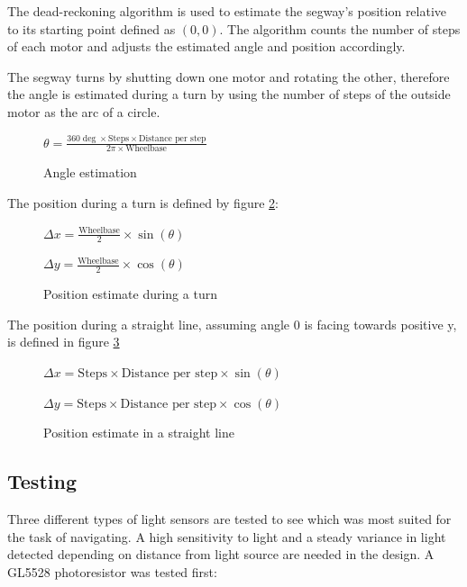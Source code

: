The dead-reckoning algorithm is used to estimate the segway's position relative to its starting point defined as \((0,0)\). The algorithm counts the number of steps of each motor and adjusts the estimated angle and position accordingly.

The segway turns by shutting down one motor and rotating the other, therefore the angle is estimated during a turn by using the number of steps of the outside motor as the arc of a circle.

\begin{figure}
    \centering
    \(\theta = \frac{360 \deg \times \text{Steps} \times \text{Distance per step} }{2 \pi \times \text{Wheelbase}}\)
    \caption{Angle estimation}
    \label{formula:angle_estimate}
\end{figure}
The position during a turn is defined by figure \ref{formula:position_estimate_turn}:

\begin{figure}
    \centering
    \(\Delta x = \frac{\text{Wheelbase}}{2} \times \sin(\theta)\)

    \(\Delta y = \frac{\text{Wheelbase}}{2} \times \cos(\theta)\)
    \caption{Position estimate during a turn}
    \label{formula:position_estimate_turn}
\end{figure}

The position during a straight line, assuming angle 0 is facing towards positive y, is defined in figure \ref{formula:position_estimate_straight}

\begin{figure}
    \centering
    \(\Delta x = \text{Steps} \times \text{Distance per step} \times \sin(\theta)\)

    \(\Delta y = \text{Steps} \times \text{Distance per step} \times \cos(\theta)\)
    \caption{Position estimate in a straight line}
    \label{formula:position_estimate_straight}
\end{figure}


\subsection{Testing}

Three different types of light sensors are tested to see which was most suited for the task of navigating. A high sensitivity to light and a steady variance in light detected depending on distance from light source are needed in the design. A GL5528 photoresistor was tested first:


